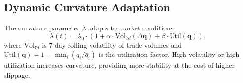\subsection{Dynamic Curvature Adaptation}

The curvature parameter $\lambda$ adapts to market conditions:
\begin{equation}
\lambda(t) = \lambda_0 \cdot \left(1 + \alpha \cdot \text{Vol}_{7d}(\Delta\bm{q}) + \beta \cdot \text{Util}(\bm{q})\right),
\end{equation}
where $\text{Vol}_{7d}$ is 7-day rolling volatility of trade volumes and $\text{Util}(\bm{q}) = 1 - \min_i(q_i / \bar{q}_i)$ is the utilization factor. High volatility or high utilization increases curvature, providing more stability at the cost of higher slippage.

